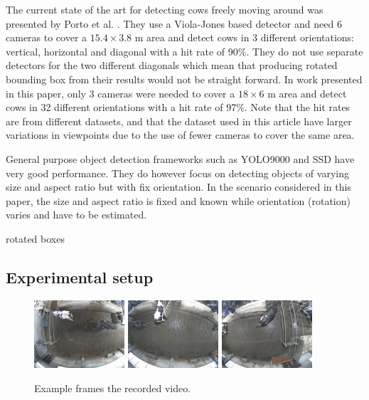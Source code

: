 \documentclass{IET}
\begin{document}
The current state of the art for detecting cows freely moving around was presented by Porto et al. \cite{porto2015automatic}. They use a Viola-Jones based detector and need 
6 cameras to cover a $15.4 \times 3.8$ m area and detect cows in 3 different orientations: vertical, horizontal and diagonal with a hit rate of 90\%. They do not use separate detectors for the two different diagonals which mean that producing rotated bounding box from their results would not be straight forward. In work presented in this paper, only 3 cameras were needed to cover a $18 \times 6$ m area and detect cows in 32 different orientations with a hit rate of 97\%. Note that the hit rates are from different datasets, and that the dataset used in this article have larger variations in viewpoints due to the use of fewer cameras to cover the same area.

General purpose object detection frameworks such as YOLO9000 \cite{FIXME} and SSD \cite{FXIME} have very good performance. They do however focus on detecting objects of varying size and aspect ratio but with fix orientation. In the scenario considered in this paper, the size and aspect ratio is fixed and known while orientation (rotation) varies and have to be estimated.

rotated boxes

\subsection{Experimental setup}

\begin{figure}[tb]
\begin{center}
  \includegraphics[width=0.3\textwidth]{old-2.jpg}
  \includegraphics[width=0.3\textwidth]{old-1.jpg}
  \includegraphics[width=0.3\textwidth]{old-0.jpg}
\end{center}
  \caption{Example frames the recorded video.}
  \label{fig:old}
\end{figure}
\end{document}
